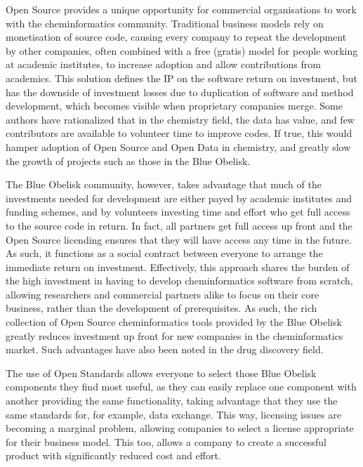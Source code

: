 \documentclass[10pt]{bmc_article}
\newenvironment{bmcformat}{\fussy\setboolean{publ}{true}}{\fussy}
\begin{document}
\begin{bmcformat}
Open Source provides a unique opportunity for commercial organisations to work with the
cheminformatics community. Traditional business models rely on monetisation of source
code, causing every company to repeat the development by other companies, often combined
with a free (gratis) model for people working at academic institutes, to increase adoption
and allow contributions from academics. This solution defines the IP on the software
return on investment, but has the downside of investment losses due to duplication of
software and method development, which becomes visible when proprietary companies
merge. Some authors have rationalized that in the chemistry field, the
data has value, and few contributors are available to volunteer time
to improve codes.\cite{Stahl:2005fk} If true, this would hamper
adoption of Open Source and Open Data in chemistry, and greatly slow
the growth of projects such as those in the Blue Obelisk.

The Blue Obelisk community, however, takes advantage that much of the investments needed
for development are either payed by academic institutes and funding schemes, and by
volunteers investing time and effort who get full access to the source code in return.
In fact, all partners get full access up front and the Open Source licending ensures
that they will have access any time in the future. As such, it functions as a social
contract between everyone to arrange the immediate return on investment. Effectively,
this approach shares the burden of the high investment in having to develop cheminformatics
software from scratch, allowing researchers and commercial partners alike to focus
on their core business, rather than the development of prerequisites. As such, the rich
collection of Open Source cheminformatics tools provided by the Blue Obelisk
greatly reduces investment up front for new companies in the
cheminformatics market. Such advantages have also been noted in the
drug discovery field.\cite{DeLano:2005uq}\cite{Munos:2006vn}\cite{Geldenhuys:2006kx}

The use of Open Standards allows everyone to select those Blue Obelisk components
they find most useful, as they can easily replace one component with another providing
the same functionality, taking advantage that they use the same standards for,
for example, data exchange. This way, licensing issues are becoming a marginal
problem, allowing companies to select a license appropriate for their business
model. This too, allows a company to create a successful product with significantly
reduced cost and effort.


\end{bmcformat}
\end{document}
